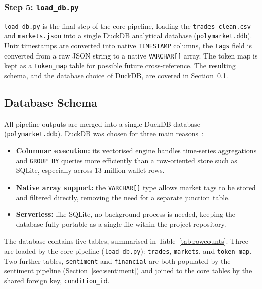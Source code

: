 \documentclass[11pt]{article}
\begin{document}
  
\subsubsection*{Step 5: \texttt{load\_db.py}}

\texttt{load\_db.py} is the final step of the core pipeline, loading the
\texttt{trades\_clean.csv} and \texttt{markets.json} into a single
DuckDB analytical database (\texttt{polymarket.ddb}).
Unix timestamps are converted into native \texttt{TIMESTAMP} columns, the
\texttt{tags} field is converted from a raw JSON string to a native
\texttt{VARCHAR[]} array.
The token map is kept as a \texttt{token\_map} table for possible future
cross-reference.
The resulting schema, and the database choice of DuckDB, are covered in Section~\ref{sec:schema}.


\subsection{Database Schema}
\label{sec:schema}

All pipeline outputs are merged into a single DuckDB
database (\texttt{polymarket.ddb}).  DuckDB was chosen for three main reasons~\cite{duckdb}:

\begin{itemize}
    \item \textbf{Columnar execution:} its vectorised engine handles
          time-series aggregations and \texttt{GROUP BY} queries more efficiently than a row-oriented store such as SQLite, especially across 13 million wallet rows. 
    \item \textbf{Native array support:} the \texttt{VARCHAR[]} type
          allows market tags to be stored and filtered directly, removing
          the need for a separate junction table.
    \item \textbf{Serverless:} like SQLite, no background process is needed, keeping
          the database fully portable as a single file within the project
          repository.
\end{itemize}

\noindent The database contains five tables, summarised in
Table~\ref{tab:rowcounts}.  Three are loaded by the core pipeline
(\texttt{load\_db.py}): \texttt{trades}, \texttt{markets}, and
\texttt{token\_map}.  Two further tables, \texttt{sentiment} and
\texttt{financial} are both populated by the sentiment pipeline
(Section~\ref{sec:sentiment}) and joined to the core tables by the shared foreign key,
\texttt{condition\_id}.
\end{document}
